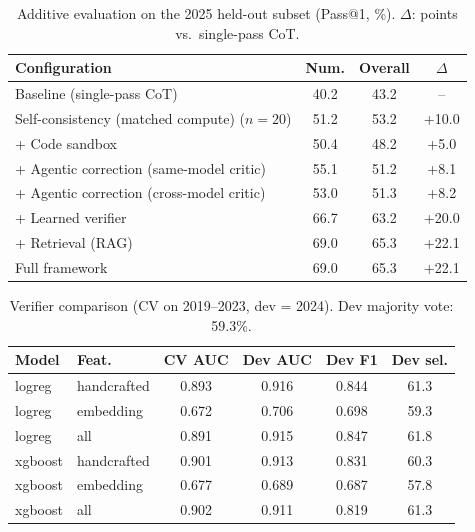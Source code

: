 \begin{table}[t]\centering\caption{Additive evaluation on the 2025 held-out subset (Pass@1, \%). $\Delta$: points vs.\ single-pass CoT.}\label{tab:main}
\begin{tabular}{lccc}\toprule
Configuration & Num. & Overall & $\Delta$ \\\midrule
Baseline (single-pass CoT) & 40.2 & 43.2 & -- \\
Self-consistency (matched compute) ($n{=}20$) & 51.2 & 53.2 & +10.0 \\
+ Code sandbox & 50.4 & 48.2 & +5.0 \\
+ Agentic correction (same-model critic) & 55.1 & 51.2 & +8.1 \\
+ Agentic correction (cross-model critic) & 53.0 & 51.3 & +8.2 \\
+ Learned verifier & 66.7 & 63.2 & +20.0 \\
+ Retrieval (RAG) & 69.0 & 65.3 & +22.1 \\
Full framework & 69.0 & 65.3 & +22.1 \\
\bottomrule\end{tabular}\end{table}

\begin{table}[t]\centering\caption{Verifier comparison (CV on 2019--2023, dev = 2024). Dev majority vote: 59.3\%.}\label{tab:verifier}
\begin{tabular}{llcccc}\toprule
Model & Feat. & CV AUC & Dev AUC & Dev F1 & Dev sel. \\\midrule
logreg & handcrafted & 0.893 & 0.916 & 0.844 & 61.3 \\
logreg & embedding & 0.672 & 0.706 & 0.698 & 59.3 \\
logreg & all & 0.891 & 0.915 & 0.847 & 61.8 \\
xgboost & handcrafted & 0.901 & 0.913 & 0.831 & 60.3 \\
xgboost & embedding & 0.677 & 0.689 & 0.687 & 57.8 \\
xgboost & all & 0.902 & 0.911 & 0.819 & 61.3 \\
\bottomrule\end{tabular}\end{table}

